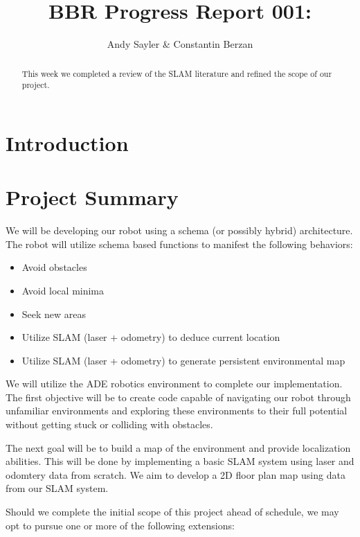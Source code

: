 \documentclass[12pt]{article}
\begin{document}
\title{BBR Progress Report 001: }

\author{Andy Sayler & Constantin Berzan}

\maketitle

\begin{abstract}
This week we completed a review of the SLAM literature and refined the scope of our
project.
\end{abstract}


\section{Introduction}



\section{Project Summary}

We will be developing our robot using a schema (or possibly hybrid)
architecture. The robot will utilize schema based functions to manifest the
following behaviors:

\begin{itemize}
    \item Avoid obstacles
    \item Avoid local minima
    \item Seek new areas
    \item Utilize SLAM (laser + odometry) to deduce current location
    \item Utilize SLAM (laser + odometry) to generate persistent environmental map
\end{itemize}

We will utilize the ADE robotics environment to complete our implementation.
The first objective will be to create code capable of navigating our robot
through unfamiliar environments and exploring these environments to their full
potential without getting stuck or colliding with obstacles. 

The next goal will be to build a map of the environment and provide
localization abilities. This will be done by implementing a basic SLAM system
using laser and odomtery data from scratch.  We aim to develop a 2D floor plan
map using data from our SLAM system.

Should we complete the initial scope of this project ahead of schedule, we may
opt to pursue one or more of the following extensions:
\end{document}
